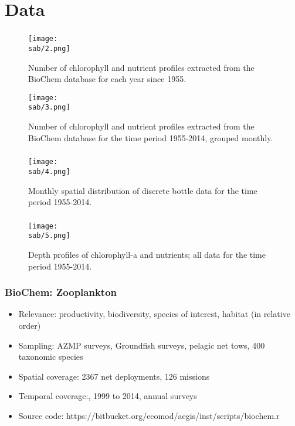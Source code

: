 \documentclass{beamer}
\numberwithin{figure}{section}		%
\numberwithin{table}{section}				%
\newcommand{\D}{.}
\newcommand{\bd}{\string~/bio\D data}   %
\newcommand{\sab}{\bd/mpa/sab}   %
\begin{document}
\section{Data}
\begin{frame}
  \frametitle{}
      \begin{figure}
        \centering
        \texttt{[image: \\sab/2.png]}
        \caption{Number of chlorophyll and nutrient profiles extracted from the BioChem database for each year since 1955.}
        \label{fig:ChloroMap}
      \end{figure}
      \begin{figure}
        \centering
        \texttt{[image: \\sab/3.png]}
        \caption{Number of chlorophyll and nutrient profiles extracted from the BioChem database for the time period 1955-2014, grouped monthly.}
        \label{fig:ChloroFreq}
      \end{figure}
\end{frame}



\begin{frame}[shrink]
  \frametitle{}
  \begin{figure}
    \centering
    \texttt{[image: \\sab/4.png]}
    \caption{Monthly spatial distribution of discrete bottle data for the time period 1955-2014.}
    \label{fig:BottleMap}
  \end{figure}
\end{frame}



\begin{frame}
  \frametitle{}
  \begin{figure}
    \centering
    \texttt{[image: \\sab/5.png]}
    \caption{Depth profiles of chlorophyll-a and nutrients; all data for the time period 1955-2014.}
    \label{fig:ChloroProfiles}
  \end{figure}
\end{frame}




\begin{frame}
  \frametitle{BioChem: Zooplankton}
  \begin{itemize}  
    \item Relevance:  productivity, biodiversity, species of interest, habitat (in relative order)
    \item Sampling:  AZMP surveys, Groundfish surveys, pelagic net tows, 400 taxonomic species
    \item Spatial coverage: 2367 net deployments, 126 missions 
    \item Temporal coverage:,  1999 to 2014, annual surveys
    \item Source code: https://bitbucket.org/ecomod/aegis/inst/scripts/biochem.r
  \end{itemize}
\end{frame}
\end{document}
